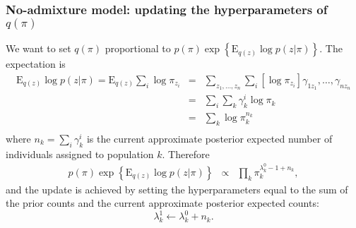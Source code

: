 \documentclass[12pt,a4paper,reqno]{article}
\newcommand{\E}{\text{E}{}}
\newcommand{\(}{\left(}
\newcommand{\)}{\right)}
\newcommand{\|}{\arrowvert}
\begin{document}
\subsubsection{No-admixture model: updating the hyperparameters of $q(\pi)$} \label{q(pi)-update-no-admixture}
We want to set $q(\pi)$ proportional to $p(\pi)\exp\left\{\E_{q(z)} \log p(z|\pi)\right\}$. The expectation is
\begin{eqnarray*}
  \E_{q(z)} \log p(z|\pi)  = \E_{q(z)} \sum_{i} \log \pi_{z_{i}}
  &=& \sum_{z_{1},\ldots,z_{n}}\sum_{i} \left[\log \pi_{z_{i}} \right] \gamma_{1z_{1}},\ldots, \gamma_{nz_{n}}\\
  &=& \sum_{i} \sum_{k} \gamma^{i}_{k} \log \pi_{k} \\
  &=& \sum_{k} \log \pi_{k}^{n_{k}}   \\
 \end{eqnarray*}
where $n_{k} = \sum_{i} \gamma^{i}_{k}$ is the current approximate posterior expected number of individuals assigned to population $k$. Therefore
\begin{eqnarray*}
  p(\pi)\exp\left\{\E_{q(z)} \log p(z|\pi)\right\}
&\propto& \prod_{k}\pi_{k}^{\lambda^{0}_{k} - 1 + n_{k} },
\end{eqnarray*}
and the update is achieved by setting the hyperparameters equal to the sum of the prior counts and the current approximate posterior expected counts:
\begin{equation*}
  \lambda^{1}_{k} \leftarrow \lambda^{0}_{k} + n_{k}.
\end{equation*}
\end{document}
